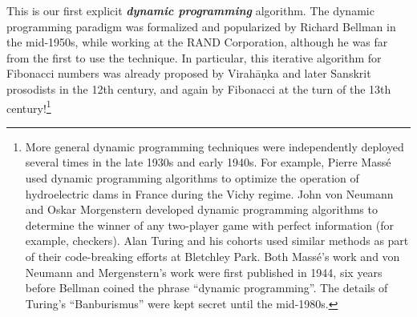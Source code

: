 This is our first explicit \textbf{\textit{dynamic programming}} algorithm.
The dynamic programming paradigm was formalized and popularized by Richard Bellman in the mid-1950s, while working at the RAND Corporation, although he was far from the first to use the technique.
In particular, this iterative algorithm for Fibonacci numbers was already proposed by Virah\=a\d{n}ka and later Sanskrit prosodists in the 12th century, and again by Fibonacci at the turn of the 13th century!\footnote{More general dynamic programming techniques were independently deployed several times in the late 1930s and early 1940s. For example, Pierre Massé used dynamic programming algorithms to optimize the operation of hydroelectric dams in France during the Vichy regime. John von Neumann and Oskar Morgenstern developed dynamic programming algorithms to determine the winner of any two-player game with perfect information (for example, checkers). Alan Turing and his cohorts used similar methods as part of their code-breaking efforts at Bletchley Park. Both Massé’s work and von Neumann and Mergenstern’s work were first published in 1944, six years before Bellman coined the phrase “dynamic programming”. The details of Turing’s “Banburismus” were kept secret until the mid-1980s.}

